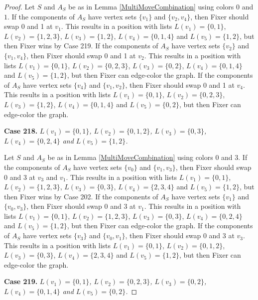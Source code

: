 \documentclass[12pt]{amsart}
\theoremstyle{plain}
\theoremstyle{definition}
\theoremstyle{remark}
\begin{document}
\begin{proof}
Let $S$ and $A_S$ be as in Lemma \ref{MultiMoveCombination} using colors $0$ and $1$. If the components of $A_S$ have vertex sets $\{v_1\}$ and $\{v_2, v_4\}$, then Fixer should swap 0 and 1 at $v_1$. This results in a position with lists $L(v_1) = \{0, 1\}$, $L(v_2) = \{1, 2, 3\}$, $L(v_3) = \{1, 2\}$, $L(v_4) = \{0, 1, 4\}$ and $L(v_5) = \{1, 2\}$, but then Fixer wins by Case 219.
If the components of $A_S$ have vertex sets $\{v_2\}$ and $\{v_1, v_4\}$, then Fixer should swap 0 and 1 at $v_2$. This results in a position with lists $L(v_1) = \{0, 1\}$, $L(v_2) = \{0, 2, 3\}$, $L(v_3) = \{0, 2\}$, $L(v_4) = \{0, 1, 4\}$ and $L(v_5) = \{1, 2\}$, but then Fixer can edge-color the graph.
If the components of $A_S$ have vertex sets $\{v_4\}$ and $\{v_1, v_2\}$, then Fixer should swap 0 and 1 at $v_4$. This results in a position with lists $L(v_1) = \{0, 1\}$, $L(v_2) = \{0, 2, 3\}$, $L(v_3) = \{1, 2\}$, $L(v_4) = \{0, 1, 4\}$ and $L(v_5) = \{0, 2\}$, but then Fixer can edge-color the graph.

\noindent\textbf{Case 218.  }\textit{$L(v_1) = \{0, 1\}$, $L(v_2) = \{0, 1, 2\}$, $L(v_3) = \{0, 3\}$, $L(v_4) = \{0, 2, 4\}$ and $L(v_5) = \{1, 2\}$.}

Let $S$ and $A_S$ be as in Lemma \ref{MultiMoveCombination} using colors $0$ and $3$. If the components of $A_S$ have vertex sets $\{v_0\}$ and $\{v_1, v_3\}$, then Fixer should swap 0 and 3 at $v_3$ and $v_1$. This results in a position with lists $L(v_1) = \{0, 1\}$, $L(v_2) = \{1, 2, 3\}$, $L(v_3) = \{0, 3\}$, $L(v_4) = \{2, 3, 4\}$ and $L(v_5) = \{1, 2\}$, but then Fixer wins by Case 202.
If the components of $A_S$ have vertex sets $\{v_1\}$ and $\{v_0, v_3\}$, then Fixer should swap 0 and 3 at $v_1$. This results in a position with lists $L(v_1) = \{0, 1\}$, $L(v_2) = \{1, 2, 3\}$, $L(v_3) = \{0, 3\}$, $L(v_4) = \{0, 2, 4\}$ and $L(v_5) = \{1, 2\}$, but then Fixer can edge-color the graph.
If the components of $A_S$ have vertex sets $\{v_3\}$ and $\{v_0, v_1\}$, then Fixer should swap 0 and 3 at $v_3$. This results in a position with lists $L(v_1) = \{0, 1\}$, $L(v_2) = \{0, 1, 2\}$, $L(v_3) = \{0, 3\}$, $L(v_4) = \{2, 3, 4\}$ and $L(v_5) = \{1, 2\}$, but then Fixer can edge-color the graph.

\noindent\textbf{Case 219.  }\textit{$L(v_1) = \{0, 1\}$, $L(v_2) = \{0, 2, 3\}$, $L(v_3) = \{0, 2\}$, $L(v_4) = \{0, 1, 4\}$ and $L(v_5) = \{0, 2\}$.}


\end{proof}
\end{document}
